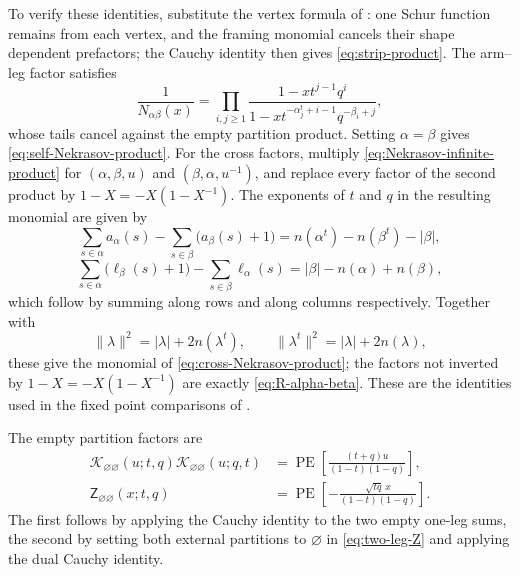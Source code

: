 \documentclass{amsart}
\theoremstyle{definition}
\numberwithin{equation}{section}
\newcommand{\PE}{\operatorname{PE}}
\begin{document}
To verify these identities, substitute the vertex formula of \cite[Section~2]{IqbalKozcaz}: one Schur function remains from each vertex, and the framing monomial cancels their shape dependent prefactors; the Cauchy identity then gives \eqref{eq:strip-product}.  The arm--leg factor satisfies
\begin{equation}
 \frac1{N_{\alpha\beta}(x)}
 =\prod_{i,j\geq1}
 \frac{1-x t^{j-1}q^i}
 {1-x t^{-\alpha_j^t+i-1}q^{-\beta_i+j}},
\label{eq:Nekrasov-infinite-product}
\end{equation}
whose tails cancel against the empty partition product.  Setting \(\alpha=\beta\) gives \eqref{eq:self-Nekrasov-product}.  For the cross factors, multiply \eqref{eq:Nekrasov-infinite-product} for \((\alpha,\beta,u)\) and \((\beta,\alpha,u^{-1})\), and replace every factor of the second product by \(1-X=-X(1-X^{-1})\).  The exponents of \(t\) and \(q\) in the resulting monomial are given by
\[
 \sum_{s\in\alpha}a_\alpha(s)
 -\sum_{s\in\beta}\bigl(a_\beta(s)+1\bigr)
 =n(\alpha^t)-n(\beta^t)-|\beta|,
\]
\[
 \sum_{s\in\alpha}\bigl(\ell_\beta(s)+1\bigr)
 -\sum_{s\in\beta}\ell_\alpha(s)
 =|\beta|-n(\alpha)+n(\beta),
\]
which follow by summing along rows and along columns respectively.  Together with
\[
 \|\lambda\|^2=|\lambda|+2n(\lambda^t),\qquad
 \|\lambda^t\|^2=|\lambda|+2n(\lambda),
\]
these give the monomial of \eqref{eq:cross-Nekrasov-product}; the factors not inverted by \(1-X=-X(1-X^{-1})\) are exactly \eqref{eq:R-alpha-beta}.  These are the identities used in the fixed point comparisons of \cite{TakiRefined,AwataKanno}.

The empty partition factors are
\begin{align}
\mathcal K_{\varnothing\varnothing}(u;t,q)
\mathcal K_{\varnothing\varnothing}(u;q,t)
&=
 \PE\left[\frac{(t+q)u}{(1-t)(1-q)}\right],
\label{eq:empty-one-leg-factors}\\
 \mathsf Z_{\varnothing\varnothing}(x;t,q)
 &=\PE\left[-\frac{\sqrt{tq}\,x}{(1-t)(1-q)}\right].
\label{eq:empty-two-leg-explicit}
\end{align}
The first follows by applying the Cauchy identity to the two empty one-leg sums, the second by setting both external partitions to \(\varnothing\) in \eqref{eq:two-leg-Z} and applying the dual Cauchy identity.
\end{document}
